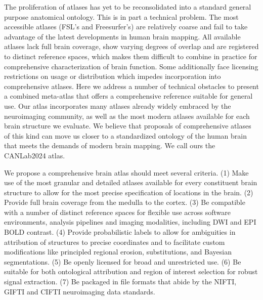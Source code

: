 \documentclass[10pt,letterpaper]{article}
\begin{document}
The proliferation of atlases has yet to be reconsolidated into a standard general purpose anatomical ontology. This is in part a technical problem. The most accessible atlases (FSL's and Freesurfer's) are relatively coarse and fail to take advantage of the latest developments in human brain mapping. All available atlases lack full brain coverage, show varying degrees of overlap and are registered to distinct reference spaces, which makes them difficult to combine in practice for comprehensive characterization of brain function. Some additionally face licensing restrictions on usage or distribution which impedes incorporation into comprehensive atlases. Here we address a number of technical obstacles to present a combined meta-atlas that offers a comprehensive reference suitable for general use. Our atlas incorporates many atlases already widely embraced by the neuroimaging community, as well as the most modern atlases available for each brain structure we evaluate. We believe that proposals of comprehensive atlases of this kind can move us closer to a standardized ontology of the human brain that meets the demands of modern brain mapping. We call ours the CANLab2024 atlas.

We propose a comprehensive brain atlas should meet several criteria. (1) Make use of the most granular and detailed atlases available for every constituent brain structure to allow for the most precise specification of locations in the brain. (2) Provide full brain coverage from the medulla to the cortex. (3) Be compatible with a number of distinct reference spaces for flexible use across software environments, analysis pipelines and imaging modalities, including DWI and EPI BOLD contrast. (4) Provide probabilistic labels to allow for ambiguities in attribution of structures to precise coordinates and to facilitate custom modifications like principled regional erosion, substitutions, and Bayesian segmentations. (5) Be openly licensed for broad and unrestricted use. (6) Be suitable for both ontological attribution and region of interest selection for robust signal extraction. (7) Be packaged in file formats that abide by the NIFTI, GIFTI and CIFTI neuroimaging data standards. 
\end{document}
